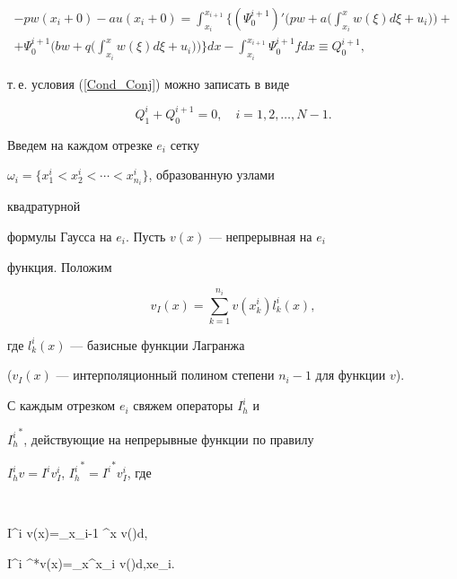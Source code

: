 \begin{multline}\label{Potok2}


-pw(x_i+0)-au(x_i+0)=\int_{x_i }^{x_{i+1} }


\bigg\{ (\Psi_0^{i+1})'\bigg(pw+


a\bigg(\int_{x_i}^x{w(\xi)d\xi }+ u_i\bigg)\bigg)+\\


%


+ \Psi_0^{i+1} \bigg(bw+q\bigg(\int_{x_i }^x {w(\xi)d\xi }+


u_i\bigg)\bigg)\bigg\} dx -


\int_{x_i }^{x_{i+1} } {\Psi_0^{i+1} fdx} \equiv Q_{0}^{i+1},


\end{multline}


т.\,е. условия (\ref{Cond_Conj}) можно записать в виде


\begin{equation} \label{Cond_Conj_Int}


Q_{1}^i+Q_{0}^{i+1}=0,\quad i=1,2, \dotsc, N-1.


\end{equation}





Введем на каждом отрезке $e_i$ сетку


$\omega_i=\{ x_1^i < x_2^i < \dotsb < x_{n_i }^i \} $, образованную узлами


квадратурной


формулы Гаусса на $e_i$. Пусть $v(x)$ --- непрерывная на $e_i$


функция. Положим


$$


v_I (x)=\sum_{k=1}^{n_i} {v (x_k^i)l_k^i (x)},


$$


где $l_k^i (x)$ --- базисные функции Лагранжа


($v_I(x)$ --- интерполяционный полином степени $n_i-1$ для функции $v$).


С каждым отрезком $e_i$ свяжем операторы $I_h^i$ и


${I_h^i}^*$, действующие на непрерывные функции по правилу


$I_h^i v=I^i v_I^i$, ${I_h^i}^*={I^i}^* v_I^i$, где


$$


I^i v(x)=\int_{x_{i-1} }^x {v(\xi)d\xi },\quad


{I^i }^*v(x)=\int_x^{x_i } {v(\xi)d\xi },\quad x\in e_i.


